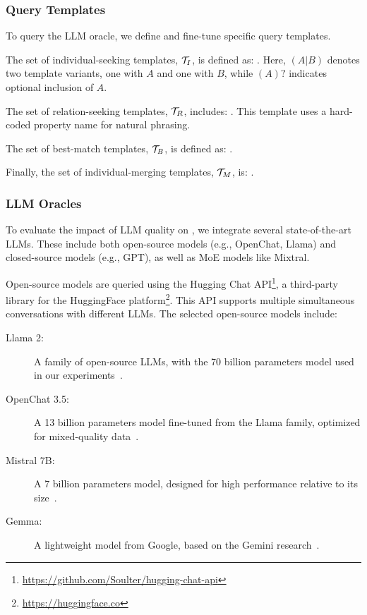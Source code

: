 %
\subsubsection{Query Templates}
\label{subsubsec:query-templates}
%
To query the \gls{LLM} oracle, we define and fine-tune specific query templates.

%
The set of individual-seeking templates, $\relset{T}_{I}$, is defined as:
%
.
%
Here, $(A|B)$ denotes two template variants, one with $A$ and one with $B$, while $(A)?$ indicates optional inclusion of $A$.

%
The set of relation-seeking templates, $\relset{T}_{R}$, includes:
%
.
%
This template uses a hard-coded property name for natural phrasing.

%
The set of best-match templates, $\relset{T}_{B}$, is defined as:
%
.

%
Finally, the set of individual-merging templates, $\relset{T}_{M}$, is:
%
.

%
\subsubsection{\gls{LLM} Oracles}
\label{subsubsec:llms-oracles}
%
To evaluate the impact of \gls{LLM} quality on \llmfkg{}, we integrate several state-of-the-art \glspl{LLM}.
%
These include both open-source models (e.g., OpenChat, Llama) and closed-source models (e.g., GPT), as well as \gls{MoE} models like Mixtral.

%
Open-source models are queried using the Hugging Chat API\footnote{\url{https://github.com/Soulter/hugging-chat-api}}, a third-party library for the HuggingFace platform\footnote{\url{https://huggingface.co}}.
%
This API supports multiple simultaneous conversations with different \glspl{LLM}.
%
The selected open-source models include:
%
\begin{description}
    \item[Llama 2:] A family of open-source \glspl{LLM}, with the 70 billion parameters model used in our experiments~\cite{llama2}.
    \item[OpenChat 3.5:] A 13 billion parameters model fine-tuned from the Llama family, optimized for mixed-quality data~\cite{wang2023openchat}.
    \item[Mistral 7B:] A 7 billion parameters model, designed for high performance relative to its size~\cite{mistral}.
    \item[Gemma:] A lightweight model from Google, based on the Gemini research~\cite{gemini}.
\end{description}

